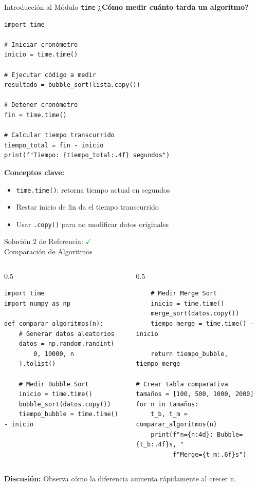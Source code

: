 \documentclass[10pt]{beamer}
\begin{document}
\begin{frame}[fragile]{Introducción al Módulo \texttt{time}}
  \textbf{¿Cómo medir cuánto tarda un algoritmo?}
  
\begin{verbatim}
import time

# Iniciar cronómetro
inicio = time.time()

# Ejecutar código a medir
resultado = bubble_sort(lista.copy())

# Detener cronómetro
fin = time.time()

# Calcular tiempo transcurrido
tiempo_total = fin - inicio
print(f"Tiempo: {tiempo_total:.4f} segundos")
\end{verbatim}

\vspace{0.3cm}
\textbf{Conceptos clave:}
\begin{itemize}
  \item \texttt{time.time()}: retorna tiempo actual en segundos
  \item Restar inicio de fin da el tiempo transcurrido
  \item Usar \texttt{.copy()} para no modificar datos originales
\end{itemize}
\end{frame}

\begin{solutionblock}
\begin{frame}[fragile]{Solución 2 de Referencia: \hfill \textcolor{green}{$\checkmark$} \\ Comparación de Algoritmos}
\begin{columns}
\begin{column}{0.5\textwidth}
\begin{verbatim}
import time
import numpy as np

def comparar_algoritmos(n):
    # Generar datos aleatorios
    datos = np.random.randint(
        0, 10000, n
    ).tolist()
    
    # Medir Bubble Sort
    inicio = time.time()
    bubble_sort(datos.copy())
    tiempo_bubble = time.time() - inicio
\end{verbatim}
\end{column}
\begin{column}{0.5\textwidth}
\begin{verbatim}
    # Medir Merge Sort
    inicio = time.time()
    merge_sort(datos.copy())
    tiempo_merge = time.time() - inicio
    
    return tiempo_bubble, tiempo_merge

# Crear tabla comparativa
tamaños = [100, 500, 1000, 2000]
for n in tamaños:
    t_b, t_m = comparar_algoritmos(n)
    print(f"n={n:4d}: Bubble={t_b:.4f}s, "
          f"Merge={t_m:.6f}s")
\end{verbatim}
\end{column}
\end{columns}
\vspace{0.3cm}
\textbf{Discusión:} Observa cómo la diferencia aumenta rápidamente al crecer n.
\end{frame}
\end{solutionblock}
\end{document}
